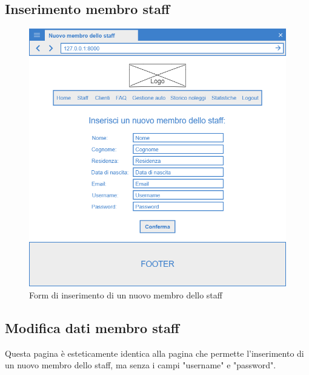 \documentclass[12pt,a4paperS]{report}
\begin{document}
\begin{normalsize}
			\subsection{Inserimento membro staff}
				\begin{figure}[H]
					\centering
					\includegraphics[width=1\textwidth, height=1\textheight, keepaspectratio]{Mockup/Nuovo_staff.png}
					\caption{Form di inserimento di un nuovo membro dello staff}
				\end{figure}
			
			\subsection{Modifica dati membro staff}
				Questa pagina è esteticamente identica alla pagina che permette l'inserimento di un nuovo membro dello staff, ma senza i campi "username" e "password".
			

\end{normalsize}
\end{document}
